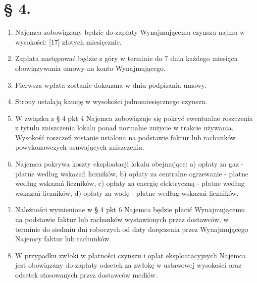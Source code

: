 \documentclass[a4paper,11pt, notitlepage]{article}
\begin{document}
\section*{§ 4.}
    \begin{enumerate}
        \item Najemca zobowiązany będzie do zapłaty Wynajmującemu czynszu najmu w wysokości:
[17] złotych miesięcznie.
        \item Zapłata następować będzie z góry w terminie do 7 dnia każdego miesiąca obowiązywania umowy na konto Wynajmującego.
 	
        \item Pierwsza wpłata zostanie dokonana w dniu podpisania umowy.
 	
        \item Strony ustalają kaucję w wysokości jednomiesięcznego czynszu.
 	
        \item W związku z § 4 pkt 4 Najemca zobowiązuje się pokryć ewentualne roszczenia z tytułu zniszczenia lokalu ponad normalne zużycie w trakcie używania. Wysokość roszczeń zostanie ustalona na podstawie faktur lub rachunków powykonawczych usuwających zniszczenia.
 	    \item Najemca pokrywa koszty eksploatacji lokalu obejmujące:
            \subitem a) opłaty za gaz - płatne według wskazań liczników,
            \subitem b) opłaty za centralne ogrzewanie - płatne według wskazań liczników,
            \subitem c) opłaty za energię elektryczną - płatne według wskazań liczników,
            \subitem d) opłaty za wodę - płatne według wskazań liczników,
 	
        \item Należności wymienione w § 4 pkt 6 Najemca będzie płacić 	Wynajmującemu na podstawie faktur lub rachunków wystawionych przez dostawców, w terminie do siedmiu dni roboczych od daty doręczenia przez Wynajmującego Najemcy faktur lub rachunków.
 	
        \item W przypadku zwłoki w płatności czynszu i opłat eksploatacyjnych Najemca jest obowiązany do zapłaty odsetek za zwłokę w ustawowej wysokości oraz odsetek stosowanych przez dostawców mediów.
    \end{enumerate}

    
\end{document}
